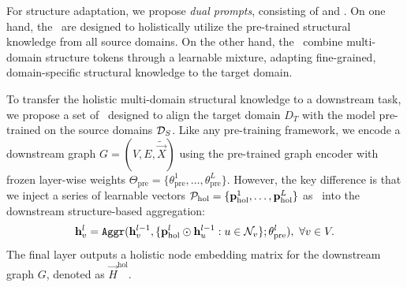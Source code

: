 For structure adaptation, we propose \emph{dual prompts}, consisting of \emph{\op} and \emph{\cp}. On one hand, the \op\ are designed to holistically utilize the pre-trained structural knowledge from all source domains. On the other hand, the \cp\ combine multi-domain structure tokens through a learnable mixture, adapting fine-grained, domain-specific structural knowledge to the target domain.






To transfer the holistic multi-domain structural knowledge to a downstream task, we propose a set of \op\ designed to align the target domain \( D_T \) with the model pre-trained on the source domains \( \mathcal{D}_S \). %
Like any pre-training framework, we encode a downstream graph $G=(V,E,\tilde{\vec{X}})$ using the pre-trained graph encoder with frozen layer-wise weights $\Theta_\text{pre}=\{\theta^1_\text{pre},\ldots,\theta^L_\text{pre}\}$. 
However, the key difference is that we inject a series of learnable vectors \( \bP_\text{hol} = \{ \Vec{p}^1_\text{hol},  \ldots, \Vec{p}^L_\text{hol} \} \) as \op\ into the downstream structure-based aggregation:
\begin{align}\label{eq.open-prompt}
    \vec{h}^l_{v} = \mathtt{Aggr}(\vec{h}^{l-1}_{v}, \{\Vec{p}^l_\text{hol} \odot \vec{h}^{l-1}_{u} : u\in\bN_v\}; \theta^l_\text{pre}),~\forall v\in V.
\end{align}
The final layer outputs a holistic node embedding matrix for the downstream graph $G$, denoted as \( \vec{H}^\text{hol}\).

